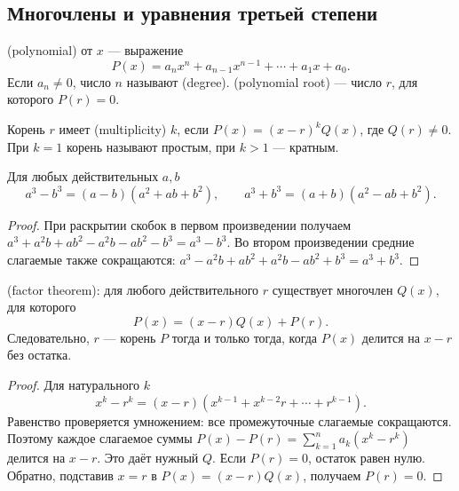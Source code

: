 \subsection*{Многочлены и уравнения третьей степени}
\begin{definition}
 (polynomial) от \(x\) — выражение
\[
P(x)=a_nx^n+a_{n-1}x^{n-1}+\cdots+a_1x+a_0.
\]
Если \(a_n\neq0\), число \(n\) называют  (degree).  (polynomial root) — число \(r\), для которого \(P(r)=0\).
\end{definition}

\begin{definition}
Корень \(r\) имеет  (multiplicity) \(k\), если \(P(x)=(x-r)^kQ(x)\), где \(Q(r)\neq0\). При \(k=1\) корень называют простым, при \(k>1\) — кратным.
\end{definition}

\begin{theorem}
Для любых действительных \(a,b\)
\[
a^3-b^3=(a-b)(a^2+ab+b^2),\qquad
a^3+b^3=(a+b)(a^2-ab+b^2).
\]
\end{theorem}
\begin{proof}
При раскрытии скобок в первом произведении получаем
\(a^3+a^2b+ab^2-a^2b-ab^2-b^3=a^3-b^3\).
Во втором произведении средние слагаемые также сокращаются:
\(a^3-a^2b+ab^2+a^2b-ab^2+b^3=a^3+b^3\).
\end{proof}

\begin{theorem}
 (factor theorem): для любого действительного \(r\) существует многочлен \(Q(x)\), для которого
\[
P(x)=(x-r)Q(x)+P(r).
\]
Следовательно, \(r\) — корень \(P\) тогда и только тогда, когда \(P(x)\) делится на \(x-r\) без остатка.
\end{theorem}
\begin{proof}
Для натурального \(k\)
\[
x^k-r^k=(x-r)(x^{k-1}+x^{k-2}r+\cdots+r^{k-1}).
\]
Равенство проверяется умножением: все промежуточные слагаемые сокращаются. Поэтому каждое слагаемое суммы \(P(x)-P(r)=\sum_{k=1}^n a_k(x^k-r^k)\) делится на \(x-r\). Это даёт нужный \(Q\). Если \(P(r)=0\), остаток равен нулю. Обратно, подставив \(x=r\) в \(P(x)=(x-r)Q(x)\), получаем \(P(r)=0\).
\end{proof}

